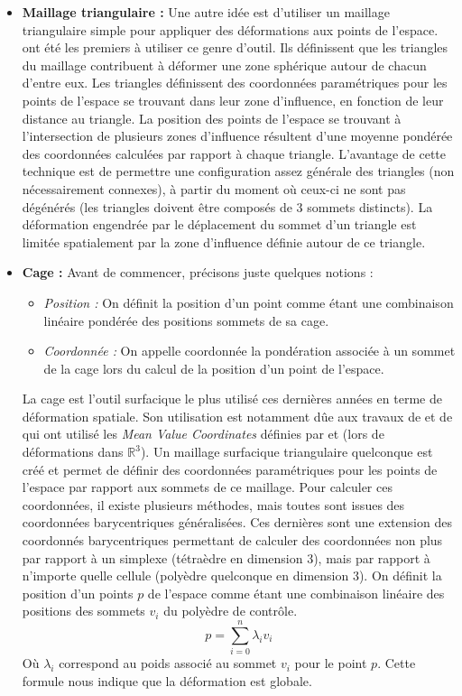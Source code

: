 \begin{itemize}
\item{\textbf{Maillage triangulaire :}} Une autre idée est d'utiliser
  un maillage triangulaire simple pour appliquer des déformations aux
  points de l'espace. \cite{KO03} ont été les premiers à utiliser ce
  genre d'outil. Ils définissent que les triangles du maillage
  contribuent à déformer une zone sphérique autour de chacun d'entre
  eux. Les triangles définissent des coordonnées paramétriques pour
  les points de l'espace se trouvant dans leur zone d'influence, en
  fonction de leur distance au triangle. La position des points de
  l'espace se trouvant à l'intersection de plusieurs zones d'influence
  résultent d'une moyenne pondérée des coordonnées calculées par
  rapport à chaque triangle. L'avantage de cette technique est de
  permettre une configuration assez générale des triangles (non
  nécessairement connexes), à partir du moment où ceux-ci ne sont pas
  dégénérés (les triangles doivent être composés de 3 sommets
  distincts). La déformation engendrée par le déplacement du sommet
  d'un triangle est limitée spatialement par la zone d'influence
  définie autour de ce triangle.
\item{\textbf{Cage :}} Avant de commencer, précisons juste quelques
  notions :
  \begin{itemize}
  \item{\textit{Position :}} On définit la position d'un point comme
    étant une combinaison linéaire pondérée des positions sommets de
    sa cage.
  \item{\textit{Coordonnée :}} On appelle coordonnée la pondération
    associée à un sommet de la cage lors du calcul de la position d'un
    point de l'espace.\\
  \end{itemize}

  La cage est l'outil surfacique le plus utilisé ces dernières années
  en terme de déformation spatiale. Son utilisation est notamment dûe
  aux travaux de \cite{JSW05} et de \cite{HF06} qui ont utilisé les
  \textit{Mean Value Coordinates} définies par \cite{Flo03} et
  \cite{FKR05} (lors de déformations dans $\mathbb{R}^3$). Un maillage
  surfacique triangulaire quelconque est créé et permet de définir des
  coordonnées paramétriques pour les points de l'espace par rapport
  aux sommets de ce maillage. Pour calculer ces coordonnées, il existe
  plusieurs méthodes, mais toutes sont issues des coordonnées
  barycentriques généralisées. Ces dernières sont une extension des
  coordonnés barycentriques permettant de calculer des coordonnées non
  plus par rapport à un simplexe (tétraèdre en dimension 3), mais par
  rapport à n'importe quelle cellule (polyèdre quelconque en dimension
  3). On définit la position d'un points $p$ de l'espace comme étant
  une combinaison linéaire des positions des sommets $v_i$ du polyèdre
  de contrôle.
  \begin{equation}
    p = \sum_{i=0}^n \lambda_iv_i
  \end{equation}
  Où $\lambda_i$ correspond au poids associé au sommet $v_i$ pour le
  point $p$. Cette formule nous indique que la déformation est
  globale.
\end{itemize}

